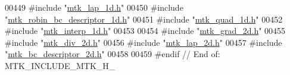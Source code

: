 \begin{DoxyCode}
00449 \textcolor{preprocessor}{#include "\hyperlink{mtk__lap__1d_8h}{mtk\_lap\_1d.h}"}
00450 \textcolor{preprocessor}{#include "\hyperlink{mtk__robin__bc__descriptor__1d_8h}{mtk\_robin\_bc\_descriptor\_1d.h}"}
00451 \textcolor{preprocessor}{#include "\hyperlink{mtk__quad__1d_8h}{mtk\_quad\_1d.h}"}
00452 \textcolor{preprocessor}{#include "\hyperlink{mtk__interp__1d_8h}{mtk\_interp\_1d.h}"}
00453 
00454 \textcolor{preprocessor}{#include "\hyperlink{mtk__grad__2d_8h}{mtk\_grad\_2d.h}"}
00455 \textcolor{preprocessor}{#include "\hyperlink{mtk__div__2d_8h}{mtk\_div\_2d.h}"}
00456 \textcolor{preprocessor}{#include "\hyperlink{mtk__lap__2d_8h}{mtk\_lap\_2d.h}"}
00457 \textcolor{preprocessor}{#include "\hyperlink{mtk__bc__descriptor__2d_8h}{mtk\_bc\_descriptor\_2d.h}"}
00458 
00459 \textcolor{preprocessor}{#endif // End of: MTK\_INCLUDE\_MTK\_H\_}
\end{DoxyCode}
